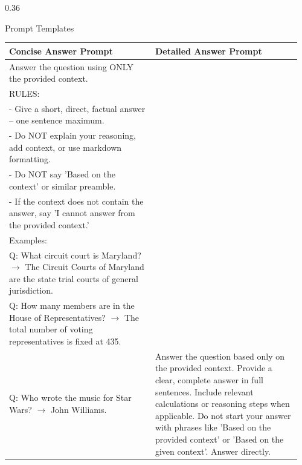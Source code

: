 \documentclass[final]{beamer}
\newcommand{\blockheading}[2]{\faIcon{#1}\hspace{0.45em}#2}
\begin{document}
\begin{frame}[t]
\begin{columns}[T,totalwidth=\textwidth]
\begin{column}{0.36\textwidth}
\begin{block}{\blockheading{comment-dots}{Prompt Templates}}
\setlength{\tabcolsep}{0.35cm}
\renewcommand{\arraystretch}{1.08}
\begin{tabular}{@{}p{0.48\linewidth}p{0.48\linewidth}@{}}
\textbf{\textcolor{PosterTeal}{Concise Answer Prompt}} &
\textbf{\textcolor{PosterTeal}{Detailed Answer Prompt}} \\
\midrule
\raggedright
\scriptsize\ttfamily
Answer the question using ONLY the provided context.\\
RULES:\\
- Give a short, direct, factual answer -- one sentence maximum.\\
- Do NOT explain your reasoning, add context, or use markdown formatting.\\
- Do NOT say 'Based on the context' or similar preamble.\\
- If the context does not contain the answer, say 'I cannot answer from the provided context.'\\
Examples:\\
Q: What circuit court is Maryland? \(\rightarrow\) The Circuit Courts of Maryland are the state trial courts of general jurisdiction.\\
Q: How many members are in the House of Representatives? \(\rightarrow\) The total number of voting representatives is fixed at 435.\\
Q: Who wrote the music for Star Wars? \(\rightarrow\) John Williams.
&
\raggedright
\scriptsize\ttfamily
Answer the question based only on the provided context. Provide a clear, complete answer in full sentences. Include relevant calculations or reasoning steps when applicable. Do not start your answer with phrases like 'Based on the provided context' or 'Based on the given context'. Answer directly.
\end{tabular}

\end{block}


\end{column}
\end{columns}
\end{frame}
\end{document}
